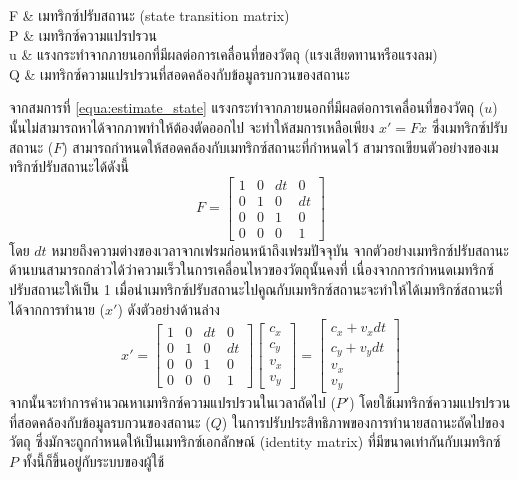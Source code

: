 \begin{enumerate}
\begin{conditions}
		F		&	เมทริกซ์ปรับสถานะ (state transition matrix)\\
		P		&	เมทริกซ์ความแปรปรวน\\
		u		&	แรงกระทำจากภายนอกที่มีผลต่อการเคลื่อนที่ของวัตถุ (แรงเสียดทานหรือแรงลม)\\
		Q		&	เมทริกซ์ความแปรปรวนที่สอดคล้องกับข้อมูลรบกวนของสถานะ
	\end{conditions}
	จากสมการที่ \ref{equa:estimate_state} แรงกระทำจากภายนอกที่มีผลต่อการเคลื่อนที่ของวัตถุ ($u$) นั้นไม่สามารถหาได้จากภาพทำให้ต้องตัดออกไป จะทำให้สมการเหลือเพียง $x' = Fx$ 
	ซึ่งเมทริกซ์ปรับสถานะ ($F$) สามารถกำหนดให้สอดคล้องกับเมทริกซ์สถานะที่กำหนดไว้ สามารถเขียนตัวอย่างของเมทริกซ์ปรับสถานะได้ดังนี้
	\begin{equation*}
		F = \begin{bmatrix}
			1& 0& dt& 0\\
			0& 1& 0& dt\\
			0& 0& 1& 0\\
			0& 0& 0& 1
		\end{bmatrix}
	\end{equation*}
	โดย $dt$ หมายถึงความต่างของเวลาจากเฟรมก่อนหน้าถึงเฟรมปัจจุบัน จากตัวอย่างเมทริกซ์ปรับสถานะด้านบนสามารถกล่าวได้ว่าความเร็วในการเคลื่อนไหวของวัตถุนั้นคงที่ 
	เนื่องจากการกำหนดเมทริกซ์ปรับสถานะให้เป็น 1 เมื่อนำเมทริกซ์ปรับสถานะไปคูณกับเมทริกซ์สถานะจะทำให้ได้เมทริกซ์สถานะที่ได้จากการทำนาย ($x'$) ดังตัวอย่างด้านล่าง
	\begin{equation*}
		x' = \begin{bmatrix}
			1& 0& dt& 0\\
			0& 1& 0& dt\\
			0& 0& 1& 0\\
			0& 0& 0& 1
		\end{bmatrix} \begin{bmatrix}
			c_x\\ c_y\\ v_x\\ v_y
		\end{bmatrix} = \begin{bmatrix}
			c_x + v_xdt\\ c_y + v_ydt\\ v_x\\ v_y
		\end{bmatrix}
	\end{equation*}
	จากนั้นจะทำการคำนวณหาเมทริกซ์ความแปรปรวนในเวลาถัดไป ($P'$) โดยใช้เมทริกซ์ความแปรปรวนที่สอดคล้องกับข้อมูลรบกวนของสถานะ ($Q$) ในการปรับประสิทธิภาพของการทำนายสถานะถัดไปของวัตถุ 
	ซึ่งมักจะถูกกำหนดให้เป็นเมทริกซ์เอกลักษณ์ (identity matrix) ที่มีขนาดเท่ากันกับเมทริกซ์ $P$ ทั้งนี้ก็ขึ้นอยู่กับระบบของผู้ใช้

\end{enumerate}

